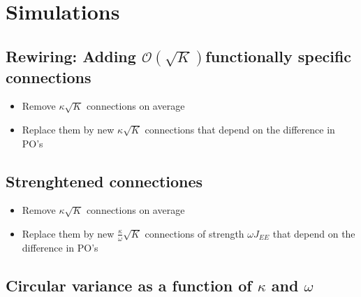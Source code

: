 \section{Simulations}

\subsection{Rewiring: Adding $\mathcal{O} (\sqrt{K})$functionally specific connections}

\begin{itemize}
	\item Remove $\kappa \sqrt{K}$ connections on average
	\item Replace them by new $\kappa \sqrt{K}$ connections that depend on the difference in PO's
\end{itemize}



\subsection{Strenghtened connectiones}
\begin{itemize}
	\item Remove $\kappa \sqrt{K}$ connections on average
	\item Replace them by new $\frac{\kappa}{\omega} \sqrt{K}$ connections of strength $\omega J_{EE}$ that depend on the difference in PO's
\end{itemize}

\subsection{Circular variance as a function of $\kappa$ and $\omega$} 


